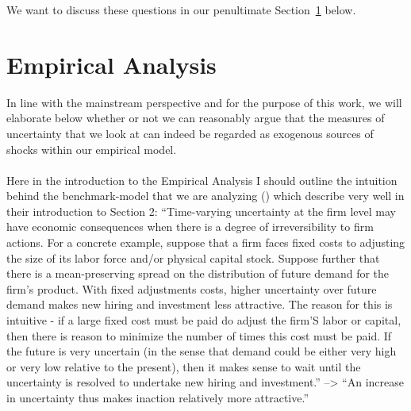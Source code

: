\documentclass[a4paper,12pt,oneside,pointednumbers,bibtotoc,bigheadings,liststotoc]{scrbook}
\begin{document}
We want to discuss these questions in our penultimate Section~\ref{sec:EmpiricalAnalysis} below.

\chapter{Empirical Analysis}
\label{sec:EmpiricalAnalysis}
In line with the mainstream perspective and for the purpose of this work, we will elaborate below whether or not we can reasonably argue that the measures of uncertainty that we look at can indeed be regarded as exogenous sources of shocks within our empirical model. \\
\\
Here in the introduction to the Empirical Analysis I should outline the intuition behind the benchmark-model that we are analyzing (\citet{bloom:09}) which \citet{bachmannetal:13} describe very well in their introduction to Section 2: ``Time-varying uncertainty at the firm level may have economic consequences when there is a degree of irreversibility to firm actions. For a concrete example, suppose that a firm faces fixed costs to adjusting the size of its labor force and/or physical capital stock. Suppose further that there is a mean-preserving spread on the distribution of future demand for the firm's product. With fixed adjustments costs, higher uncertainty over future demand makes new hiring and investment less attractive. The reason for this is intuitive - if a large fixed cost must be paid do adjust the firm'S labor or capital, then there is reason to minimize the number of times this cost must be paid. If the future is very uncertain (in the sense that demand could be either very high or very low relative to the present), then it makes sense to wait until the uncertainty is resolved to undertake new hiring and investment.'' --> ``An increase in uncertainty thus makes inaction relatively more attractive.'' 



\end{document}
